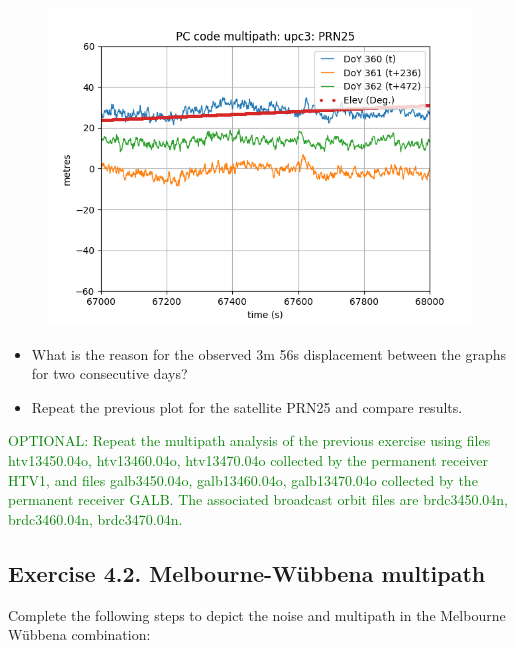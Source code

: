 \begin{figure}[H]
        \centering
        \includegraphics[scale=0.52]{sources/Figures/FIG_2/TUT2_Ex4.1.5.png}
        \caption{}
        \label{}
\end{figure}
\usepackage{subcaption}







\begin{itemize}
    \item What is the reason for the observed 3m 56s displacement between the graphs for two consecutive days?
    \item Repeat the previous plot for the satellite PRN25 and compare results.
\end{itemize}

\textcolor{Green}{OPTIONAL: Repeat the multipath analysis of the previous exercise using
files htv13450.04o, htv13460.04o, htv13470.04o collected by the
permanent receiver HTV1, and files galb3450.04o, galb13460.04o,
galb13470.04o collected by the permanent receiver GALB. The associated
broadcast orbit files are brdc3450.04n, brdc3460.04n, brdc3470.04n.}



\subsection{Exercise 4.2. Melbourne-Wübbena multipath}

Complete the following steps to depict the noise and multipath in the Melbourne Wübbena combination:

